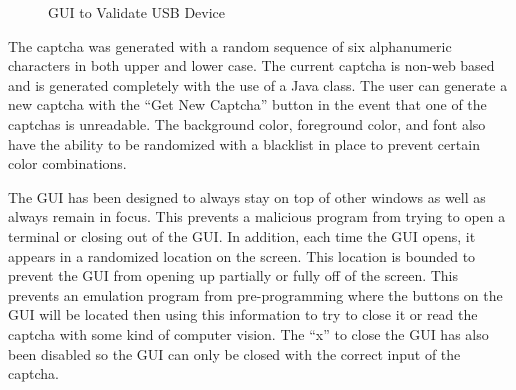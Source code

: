 \documentclass[pagenumbers]{ieee}
\begin{document}
\begin{figure}[H]
	\caption{GUI to Validate USB Device}
	\label{fig:JavaGUI}
\end{figure}

The captcha was generated with a random sequence of six alphanumeric characters in both upper and lower case. The current captcha is non-web based and is generated completely with the use of a Java class. The user can generate a new captcha with the ``Get New Captcha'' button in the event that one of the captchas is unreadable. The background color, foreground color, and font also have the ability to be randomized with a blacklist in place to prevent certain color combinations.

The GUI has been designed to always stay on top of other windows as well as always remain in focus. This prevents a malicious program from trying to open a terminal or closing out of the GUI. In addition, each time the GUI opens, it appears in a randomized location on the screen. This location is bounded to prevent the GUI from opening up partially or fully off of the screen. This prevents an emulation program from pre-programming where the buttons on the GUI will be located then using this information to try to close it or read the captcha with some kind of computer vision. The ``x'' to close the GUI has also been disabled so the GUI can only be closed with the correct input of the captcha.
\end{document}
